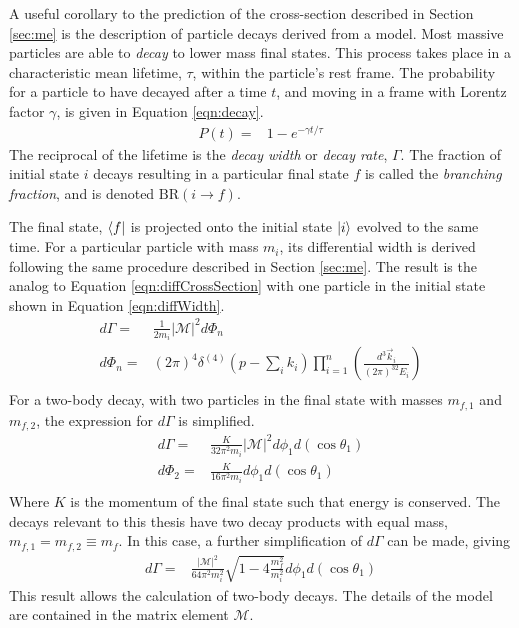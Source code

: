 A useful corollary to the prediction of the cross-section described in Section \ref{sec:me} is the description of particle decays derived from a model.
Most massive particles are able to \emph{decay} to lower mass final states.
This process takes place in a characteristic mean lifetime, $\tau$, within the particle's rest frame.
The probability for a particle to have decayed after a time $t$, and moving in a frame with Lorentz factor $\gamma$, is given in Equation \ref{eqn:decay}.
\begin{equation}\begin{split}\label{eqn:decay}
    P(t)=&1-e^{-\gamma t/\tau}
\end{split}\end{equation} 
The reciprocal of the lifetime is the \emph{decay width} or \emph{decay rate}, $\Gamma$.
The fraction of initial state $i$ decays resulting in a particular final state $f$ is called the \emph{branching fraction}, and is denoted $\text{BR}(i\to f)$.


The final state, $\bra{f}$ is projected onto the initial state $\ket{i}$ evolved to the same time.
For a particular particle with mass $m_i$, its differential width is derived following the same procedure described in Section \ref{sec:me}.
The result is the analog to Equation \ref{eqn:diffCrossSection} with one particle in the initial state shown in Equation \ref{eqn:diffWidth}.
\begin{equation}\begin{split}\label{eqn:diffWidth}
    d\Gamma=&\frac{1}{2m_i}|\mathcal{M}|^2d\Phi_n \\
    d\Phi_n=&(2\pi)^4\delta^{(4)}(p-\sum_ik_i)\prod^n_{i=1}\left(\frac{d^3\vec{k}_i}{(2\pi)^32E_i}\right) \\
\end{split}\end{equation} 
For a two-body decay, with two particles in the final state with masses $m_{f,1}$ and $m_{f,2}$, the expression for $d\Gamma$ is simplified.
\begin{equation}\begin{split}
    d\Gamma=&\frac{K}{32\pi^2m_i}|\mathcal{M}|^2d\phi_1d(\cos{\theta_1}) \\
    d\Phi_2=&\frac{K}{16\pi^2m_i}d\phi_1d(\cos{\theta_1}) \\
\end{split}\end{equation}
Where $K$ is the momentum of the final state such that energy is conserved.
The decays relevant to this thesis have two decay products with equal mass, $m_{f,1}=m_{f,2}\equiv m_f$.
In this case, a further simplification of $d\Gamma$ can be made, giving
\begin{equation}\begin{split}
    d\Gamma=&\frac{|\mathcal{M}|^2}{64\pi^2m_i^2}\sqrt{1-4\frac{m_f^2}{m_i^2}}d\phi_1d(\cos\theta_1)
\end{split}\end{equation}
This result allows the calculation of two-body decays.
The details of the model are contained in the matrix element $\mathcal{M}$.

